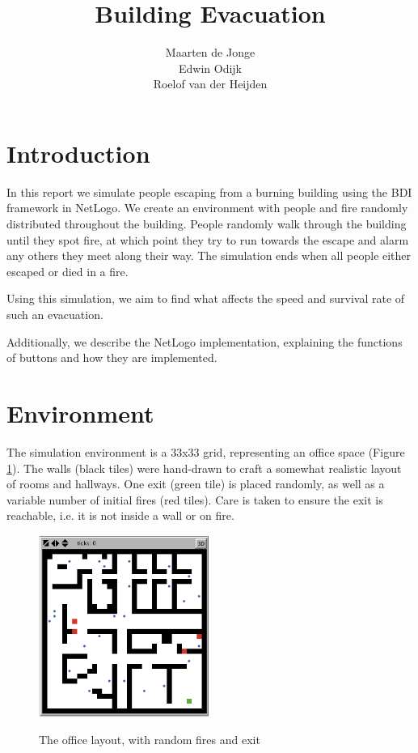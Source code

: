 \documentclass[a4paper]{article}
\title{Building Evacuation}
\author{Maarten de Jonge \\
        Edwin Odijk \\
        Roelof van der Heijden}
\begin{document}
\maketitle

\section{Introduction}
In this report we simulate people escaping from a burning building using the BDI framework in NetLogo. We create an environment with people and fire randomly distributed throughout the building. People randomly walk through the building until they spot fire, at which point they try to run towards the escape and alarm any others they meet along their way. The simulation ends when all people either escaped or died in a fire.

Using this simulation, we aim to find what affects the speed and survival rate of such an evacuation.

Additionally, we describe the NetLogo implementation, explaining the functions of buttons and how they are implemented.

\section{Environment}
\FloatBarrier
The simulation environment is a 33x33 grid, representing an office space (Figure~
\ref{fig:office}). The walls (black tiles) were hand-drawn to craft a somewhat
realistic layout of rooms and hallways. One exit (green tile) is placed
randomly, as well as a variable number of initial fires (red tiles). Care is
taken to ensure the exit is reachable, i.e. it is not inside a wall or on fire.

\begin{figure}[h!]
  \centering
  \includegraphics[width=0.5\textwidth]{office.png}
  \label{fig:office}
  \caption{The office layout, with random fires and exit}
\end{figure}
\end{document}
